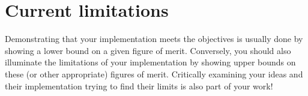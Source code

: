 \section{Current limitations}

Demonstrating that your implementation meets the objectives is usually done by showing a lower bound on a given figure of merit.
Conversely, you should also illuminate the limitations of your implementation by showing upper bounds on these (or other appropriate) figures of merit.
Critically examining your ideas and their implementation trying to find their limits is also part of your work!
